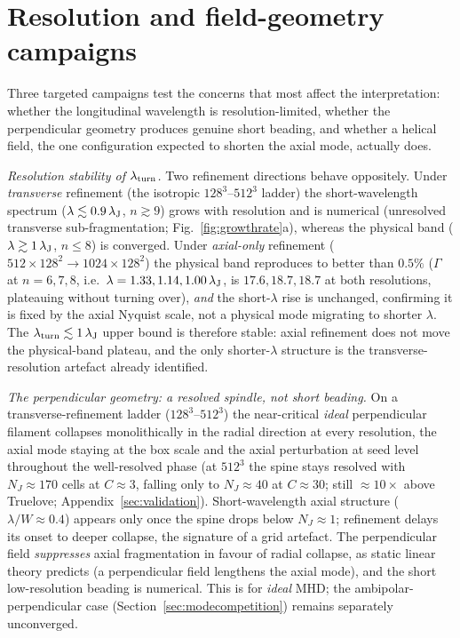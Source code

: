 \documentclass[usenatbib,twoside,twocolumn]{mnras}
\begin{document}
\section{Resolution and field-geometry campaigns}
\label{sec:optional_app}

Three targeted campaigns test the concerns that most affect the interpretation: whether the longitudinal wavelength is resolution-limited, whether the perpendicular geometry produces genuine short beading, and whether a helical field, the one configuration expected to shorten the axial mode, actually does.

\emph{Resolution stability of $\lambda_{\rm turn}$.} Two refinement directions behave oppositely. Under \emph{transverse} refinement (the isotropic $128^3$--$512^3$ ladder) the short-wavelength spectrum ($\lambda\lesssim0.9\,\lambda_{\rm J}$, $n\gtrsim9$) grows with resolution and is numerical (unresolved transverse sub-fragmentation; Fig.~\ref{fig:growthrate}a), whereas the physical band ($\lambda\gtrsim1\,\lambda_{\rm J}$, $n\leq8$) is converged. Under \emph{axial-only} refinement ($512\times128^2\to1024\times128^2$) the physical band reproduces to better than $0.5\%$ ($\Gamma$ at $n=6,7,8$, i.e.\ $\lambda=1.33,1.14,1.00\,\lambda_{\rm J}$, is $17.6,18.7,18.7$ at both resolutions, plateauing without turning over), \emph{and} the short-$\lambda$ rise is unchanged, confirming it is fixed by the axial Nyquist scale, not a physical mode migrating to shorter $\lambda$. The $\lambda_{\rm turn}\lesssim1\,\lambda_{\rm J}$ upper bound is therefore stable: axial refinement does not move the physical-band plateau, and the only shorter-$\lambda$ structure is the transverse-resolution artefact already identified.

\emph{The perpendicular geometry: a resolved spindle, not short beading.} On a transverse-refinement ladder ($128^3$--$512^3$) the near-critical \emph{ideal} perpendicular filament collapses monolithically in the radial direction at every resolution, the axial mode staying at the box scale and the axial perturbation at seed level throughout the well-resolved phase (at $512^3$ the spine stays resolved with $N_J\approx170$ cells at $C\approx3$, falling only to $N_J\approx40$ at $C\approx30$; still $\approx10\times$ above Truelove; Appendix~\ref{sec:validation}). Short-wavelength axial structure ($\lambda/W\approx0.4$) appears only once the spine drops below $N_J\approx1$; refinement delays its onset to deeper collapse, the signature of a grid artefact. The perpendicular field \emph{suppresses} axial fragmentation in favour of radial collapse, as static linear theory predicts (a perpendicular field lengthens the axial mode), and the short low-resolution beading is numerical. This is for \emph{ideal} MHD; the ambipolar-perpendicular case (Section~\ref{sec:modecompetition}) remains separately unconverged.
\end{document}
